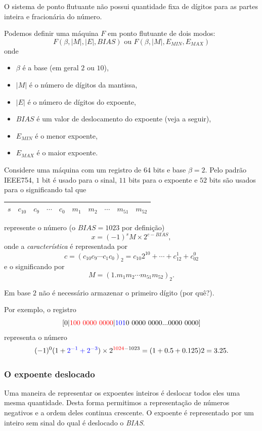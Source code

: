 O sistema de ponto flutuante não possui quantidade fixa de dígitos para as partes inteira e fracionária do número. 

Podemos definir uma máquina $F$ em ponto flutuante de dois modos:
$$ F(\beta,|M|,|E|,BIAS) \text{ ou } F(\beta,|M|,E_{MIN},E_{MAX})$$
onde
\begin{itemize}
 \item $\beta$ é a base (em geral $2$ ou $10$),
 \item $|M|$ é o número de dígitos da mantissa,
 \item $|E|$ é o número de dígitos do expoente,
 \item $BIAS$ é um valor de deslocamento do expoente (veja a seguir),
 \item $E_{MIN}$ é o menor expoente,
 \item $E_{MAX}$ é o maior expoente.
\end{itemize}


Considere uma máquina com um registro de $64$ bits e base $\beta=2$. Pelo padrão IEEE754, $1$ bit é usado para o sinal, $11$ bits para o expoente e $52$ bits são usados para o significando tal que 
\begin{center}
  \begin{tabular}{|c|c|c|c|c|c|c|c|c|c|}\hline
    $s$ & $c_{10}$ & $c_{9}$ & $\cdots$ & $c_{0}$ & $m_1$ & $m_2$ & $\cdots$ & $m_{51}$ & $m_{52}$\\\hline
  \end{tabular}  
\end{center}
represente o número (o $BIAS=1023$ por definição)
$$ x=(-1)^{s}M \times 2^{c-BIAS},$$
onde a \emph{característica} é representada por
$$c=(c_{10}c_9\cdots c_1c_0)_2=c_{10}2^{10}+\cdots+c_12^1+c_02^0 $$
e o significando por
$$M=(1.m_1m_2\cdots m_{51}m_{52})_2.$$

Em base $2$ não é necessário armazenar o primeiro dígito (por quê?).

Por exemplo, o registro
$$
[0|{\color{red}{100~0000~0000}} |{\color{blue}{101}}0~0000~0000...0000~0000]
$$
representa o número
$$
(-1)^0(1+{\color{blue}{2^{-1}+2^{-3}}})\times  2^{{\color{red}{1024}}-1023}=(1+0.5+0.125)2=3.25.
$$



\subsubsection{O expoente deslocado}
Uma maneira de representar os expoentes inteiros é deslocar todos eles uma mesma quantidade. Desta forma permitimos a representação de números negativos e a ordem deles continua crescente. O expoente é representado por um inteiro sem sinal do qual é deslocado o \emph{BIAS}.

